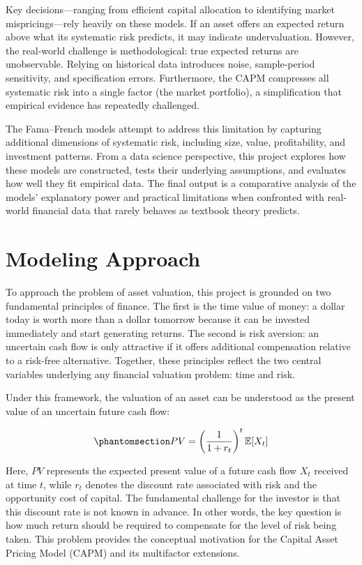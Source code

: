\documentclass[
  12pt,
  letterpaper,
]{book}
\begin{document}
Key decisions---ranging from efficient capital allocation to identifying
market mispricings---rely heavily on these models. If an asset offers an
expected return above what its systematic risk predicts, it may indicate
undervaluation. However, the real-world challenge is methodological:
true expected returns are unobservable. Relying on historical data
introduces noise, sample-period sensitivity, and specification errors.
Furthermore, the CAPM compresses all systematic risk into a single
factor (the market portfolio), a simplification that empirical evidence
has repeatedly challenged.

The Fama--French models attempt to address this limitation by capturing
additional dimensions of systematic risk, including size, value,
profitability, and investment patterns. From a data science perspective,
this project explores how these models are constructed, tests their
underlying assumptions, and evaluates how well they fit empirical data.
The final output is a comparative analysis of the models' explanatory
power and practical limitations when confronted with real-world
financial data that rarely behaves as textbook theory predicts.

\section{Modeling Approach}\label{modeling-approach}

To approach the problem of asset valuation, this project is grounded on
two fundamental principles of finance. The first is the time value of
money: a dollar today is worth more than a dollar tomorrow because it
can be invested immediately and start generating returns. The second is
risk aversion: an uncertain cash flow is only attractive if it offers
additional compensation relative to a risk-free alternative. Together,
these principles reflect the two central variables underlying any
financial valuation problem: time and risk.

Under this framework, the valuation of an asset can be understood as the
present value of an uncertain future cash flow:

\begin{equation}\phantomsection\label{eq-present-value}{
PV = \left( \frac{1}{1 + r_t} \right)^t \mathbb{E}[X_t]
}\end{equation}

Here, \(PV\) represents the expected present value of a future cash flow
\(X_t\) received at time \(t\), while \(r_t\) denotes the discount rate
associated with risk and the opportunity cost of capital. The
fundamental challenge for the investor is that this discount rate is not
known in advance. In other words, the key question is how much return
should be required to compensate for the level of risk being taken. This
problem provides the conceptual motivation for the Capital Asset Pricing
Model (CAPM) and its multifactor extensions.
\end{document}
